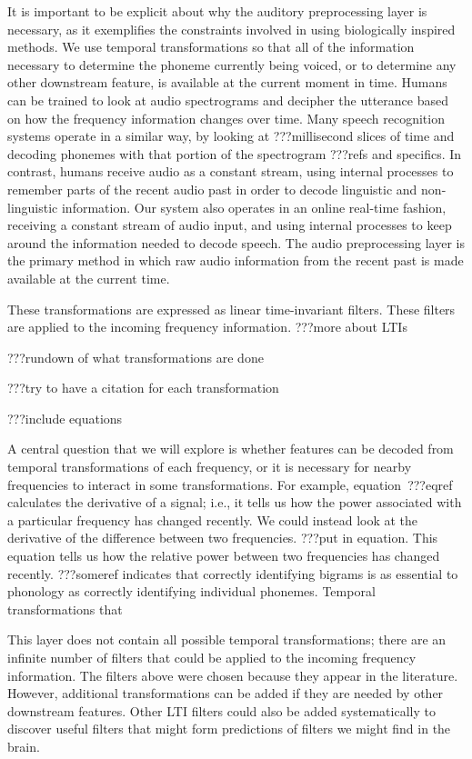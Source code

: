 It is important to be explicit about
why the auditory preprocessing layer is necessary,
as it exemplifies the constraints involved in
using biologically inspired methods.
We use temporal transformations
so that all of the information necessary
to determine the phoneme currently being voiced,
or to determine any other downstream feature,
is available at the current moment in time.
Humans can be trained to look at
audio spectrograms and decipher
the utterance based on how the
frequency information changes over time.
Many speech recognition systems operate
in a similar way, by looking at
???millisecond slices of time
and decoding phonemes with that portion
of the spectrogram ???refs and specifics.
In contrast, humans receive audio
as a constant stream,
using internal processes to remember
parts of the recent audio past
in order to decode linguistic
and non-linguistic information.
Our system also operates in
an online real-time fashion,
receiving a constant stream of audio input,
and using internal processes
to keep around the information
needed to decode speech.
The audio preprocessing layer
is the primary method in which
raw audio information from the recent past
is made available at the current time.

These transformations are expressed as
linear time-invariant filters.
These filters are applied to the incoming
frequency information.
???more about LTIs

???rundown of what transformations are done

???try to have a citation for each transformation

???include equations

A central question that we will explore
is whether features can be decoded
from temporal transformations
of each frequency,
or it is necessary for nearby frequencies
to interact in some transformations.
For example,
equation~???eqref calculates
the derivative of a signal;
i.e., it tells us how the power associated
with a particular frequency has changed recently.
We could instead look at the derivative
of the difference between two frequencies.
???put in equation.
This equation tells us how the relative
power between two frequencies
has changed recently.
???someref indicates that
correctly identifying bigrams
is as essential to phonology
as correctly identifying individual phonemes.
Temporal transformations that

This layer does not contain all possible
temporal transformations;
there are an infinite number of filters
that could be applied to the incoming
frequency information.
The filters above were chosen
because they appear in the literature.
However, additional transformations
can be added if they are needed
by other downstream features.
Other LTI filters could also be added
systematically to discover useful filters
that might form predictions of
filters we might find in the brain.


